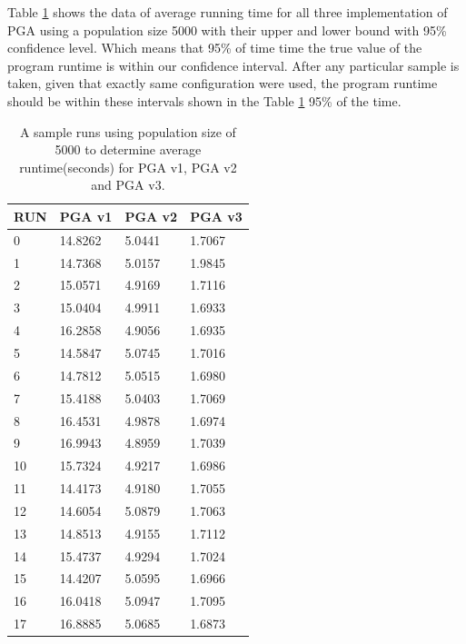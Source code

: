 Table \ref{tab:emp_table_1} shows the data of average running time for all three implementation of PGA using a population size 5000 with their upper and lower bound with 95\% confidence level. Which means that 95\% of time time the true value of the program runtime is within our confidence interval. After any particular sample is taken, given that exactly same configuration were used, the program runtime should be within these intervals shown in the Table \ref{tab:emp_table_1} 95\% of the time.


\begin{table}[!htb]
\centering
\caption{A sample runs using population size of 5000 to determine average runtime(seconds) for PGA v1, PGA v2 and PGA v3.}
\label{tab:emp_table_1}
\begin{tabular}{|l|l|l|l|}
\hline
RUN                & PGA v1   & PGA v2  & PGA v3  \\ \hline
0                  & 14.8262 & 5.0441 & 1.7067 \\ \hline
1                  & 14.7368 & 5.0157 & 1.9845 \\ \hline
2                  & 15.0571 & 4.9169 & 1.7116 \\ \hline
3                  & 15.0404 & 4.9911 & 1.6933 \\ \hline
4                  & 16.2858 & 4.9056 & 1.6935 \\ \hline
5                  & 14.5847 & 5.0745 & 1.7016 \\ \hline
6                  & 14.7812 & 5.0515 & 1.6980 \\ \hline
7                  & 15.4188 & 5.0403 & 1.7069 \\ \hline
8                  & 16.4531 & 4.9878 & 1.6974 \\ \hline
9                  & 16.9943 & 4.8959 & 1.7039 \\ \hline
10                 & 15.7324 & 4.9217 & 1.6986 \\ \hline
11                 & 14.4173 & 4.9180 & 1.7055 \\ \hline
12                 & 14.6054 & 5.0879 & 1.7063 \\ \hline
13                 & 14.8513 & 4.9155 & 1.7112 \\ \hline
14                 & 15.4737 & 4.9294 & 1.7024 \\ \hline
15                 & 14.4207 & 5.0595 & 1.6966 \\ \hline
16                 & 16.0418 & 5.0947 & 1.7095 \\ \hline
17                 & 16.8885 & 5.0685 & 1.6873 \\ \hline

\end{tabular}
\end{table}
